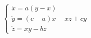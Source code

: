 \documentclass[preview,border=4pt]{standalone}
\begin{document}
\begin{equation}
\begin{cases}
\dot{x} = a(y-x) \\
\dot{y} = (c-a)x - xz + cy \\
\dot{z} = xy - bz
\end{cases}
\end{equation}
\end{document}
